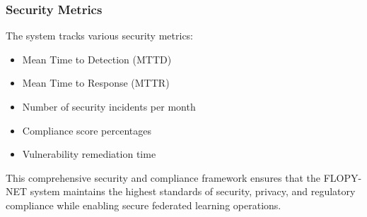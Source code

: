 \subsubsection{Security Metrics}
The system tracks various security metrics:
\begin{itemize}
    \item Mean Time to Detection (MTTD)
    \item Mean Time to Response (MTTR)
    \item Number of security incidents per month
    \item Compliance score percentages
    \item Vulnerability remediation time
\end{itemize}

This comprehensive security and compliance framework ensures that the FLOPY-NET system maintains the highest standards of security, privacy, and regulatory compliance while enabling secure federated learning operations.
